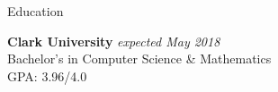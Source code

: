 \documentclass{resume} %
\begin{document}

\begin{rSection}{Education}

{\bf Clark University} \hfill {\em expected May 2018} \\ 
Bachelor's in Computer Science \& Mathematics \smallskip \\
GPA: 3.96/4.0 \\

\end{rSection}

\end{document}
